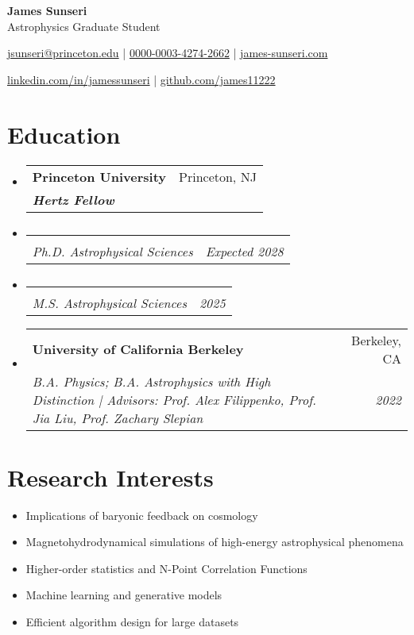 \documentclass[letterpaper,10pt]{article}
\makeatletter
\newcommand{\resumeItemSimple}[2]{
  \item\small{
    \textbf{#1}{#2 \vspace{-3pt}}
  }
}
\newcommand{\resumeSubheading}[4]{
  \vspace{-1pt}\item[]
  \begin{tabular*}{0.98\textwidth}{l@{\extracolsep{\fill}}r}
      \hspace{-10pt}\textbf{#1} & #2 \\
      \hspace{-10pt}\textit{\small#3} & \textit{\small #4} \\
    \end{tabular*}\vspace{-3pt}
}
\newcommand{\resumeSubHeadingListStart}{\begin{itemize}[leftmargin=*]}
\newcommand{\resumeSubHeadingListEnd}{\end{itemize}}
\newcommand{\resumeItemListStart}{\begin{itemize}}
\newcommand{\shorterSection}[1]{\vspace{-10pt}\section{#1}}
\newcommand{\LinkedinLogo}{\textcolor{rgb:red,6;green,108;blue,170}{\faLinkedinSquare}}
\makeatother
\begin{document}
\begin{center}
  \textbf{\huge James Sunseri} \\ \vspace{0.07in} 
  {\Large Astrophysics Graduate Student} \\ \vspace{0.05in} 
  


  {\normalsize \faSendO \hspace{0pt} \href{href="mailto:jsunseri@princeton.edu"}{jsunseri@princeton.edu} | {\Large {}} \hspace{-2pt} \href{https://orcid.org/0000-0003-4274-2662/}{0000-0003-4274-2662} | \faUser \hspace{0 pt} \href{https://www.james-sunseri.com}{james-sunseri.com} \par \vspace{0.05in} \LinkedinLogo \hspace{0pt} \href{https://www.linkedin.com/in/jamessunseri}{linkedin.com/in/jamessunseri} | \faGithubSquare \hspace{0pt} \href{https://github.com/james11222}{github.com/james11222}}
\end{center}

\shorterSection{Education}
  \resumeSubHeadingListStart
    \resumeSubheading
      {Princeton University}{Princeton, NJ}
      {\textbf{Hertz Fellow}}{}{
    }
    \vspace{-20pt}
    \resumeSubheading
    {}{}{Ph.D. Astrophysical Sciences}{Expected 2028}{
    }
    \vspace{-20pt}
    \resumeSubheading
    {}{}{M.S. Astrophysical Sciences }{2025}{
    }
    \resumeSubheading
      {University of California Berkeley}{Berkeley, CA}
      {B.A. Physics; B.A. Astrophysics with High Distinction | Advisors: Prof. Alex Filippenko, Prof. Jia Liu, Prof. Zachary Slepian}{2022}{
    }

  \resumeSubHeadingListEnd
  
 
\shorterSection{Research Interests}

\resumeItemListStart
\resumeItemSimple{}{Implications of baryonic feedback on cosmology}
\resumeItemSimple{}{Magnetohydrodynamical simulations of high-energy astrophysical phenomena}
\resumeItemSimple{}{Higher-order statistics and N-Point Correlation Functions}
\resumeItemSimple{}{Machine learning and generative models}
\resumeItemSimple{}{Efficient algorithm design for large datasets}{}
\resumeSubHeadingListEnd
\end{document}
